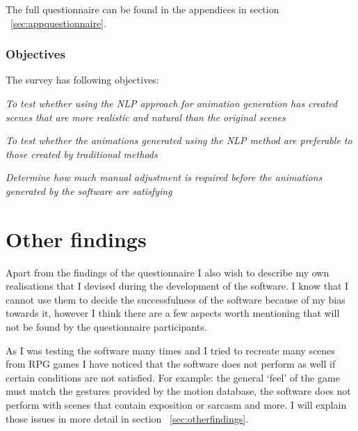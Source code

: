 The full questionnaire can be found in the appendices in section ~\ref{sec:appquestionnaire}.

\medskip
\subsubsection{Objectives}
The survey has following objectives:

\begin{addmargin}[2em]{2em}
	\noindent \textit{To test whether using the NLP approach for animation generation has created scenes that are more realistic and natural than the original scenes}
	
	\medskip
	
	\noindent \textit{To test whether the animations generated using the NLP method are preferable to those created by traditional methods}
	\medskip
	
	\noindent \textit{Determine how much manual adjustment is required before the animations generated by the software are satisfying}
\end{addmargin}



\section{Other findings \label{sec:evalotherfindings}}
Apart from the findings of the questionnaire I also wish to describe my own realisations that I devised during the development of the software. I know that I cannot use them to decide the successfulness of the software because of my bias towards it, however I think there are a few aspects worth mentioning that will not be found by the questionnaire participants.

As I was testing the software many times and I tried to recreate many scenes from RPG games I have noticed that the software does not perform as well if certain conditions are not satisfied. For example: the general `feel' of the game must match the gestures provided by the motion database, the software does not perform with scenes that contain exposition or sarcasm and more. I will explain those issues in more detail in section ~\ref{sec:otherfindings}.




